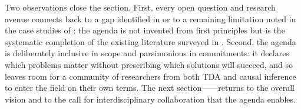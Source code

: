 Two observations close the section. First, every open question and
research avenue connects back to a gap identified in
 or to a remaining limitation noted in the case
studies of : the agenda is not invented from
first principles but is the systematic completion of the existing
literature surveyed in . Second, the agenda is
deliberately inclusive in scope and parsimonious in commitments: it
declares which problems matter without prescribing which solutions
will succeed, and so leaves room for a community of researchers from
both TDA and causal inference to enter the field on their own terms.
The next section------returns to the overall
vision and to the call for interdisciplinary collaboration that the
agenda enables.
